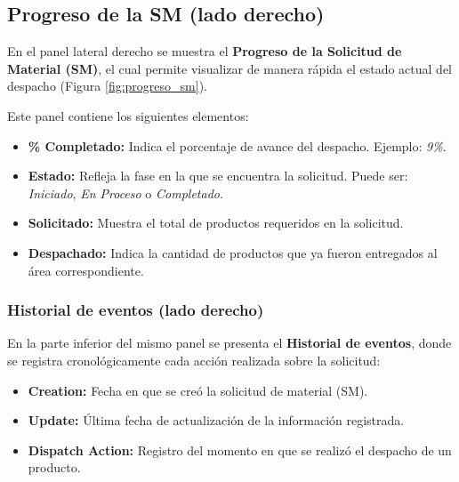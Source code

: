 \subsection{Progreso de la SM (lado derecho)}

\vspace{-0.5em} %

En el panel lateral derecho se muestra el \textbf{Progreso de la Solicitud de Material (SM)}, el cual permite visualizar de manera rápida el estado actual del despacho (Figura \ref{fig:progreso_sm}).

Este panel contiene los siguientes elementos:

\begin{itemize}
    \item \textbf{\% Completado:} Indica el porcentaje de avance del despacho.  
    Ejemplo: \textit{9\%}.
    \item \textbf{Estado:} Refleja la fase en la que se encuentra la solicitud. Puede ser:  
    \textit{Iniciado}, \textit{En Proceso} o \textit{Completado}.
    \item \textbf{Solicitado:} Muestra el total de productos requeridos en la solicitud.
    \item \textbf{Despachado:} Indica la cantidad de productos que ya fueron entregados al área correspondiente.
\end{itemize}

\subsubsection*{Historial de eventos (lado derecho)}

En la parte inferior del mismo panel se presenta el \textbf{Historial de eventos}, donde se registra cronológicamente cada acción realizada sobre la solicitud:

\begin{itemize}
    \item \textbf{Creation:} Fecha en que se creó la solicitud de material (SM).
    \item \textbf{Update:} Última fecha de actualización de la información registrada.
    \item \textbf{Dispatch Action:} Registro del momento en que se realizó el despacho de un producto.
\end{itemize}


